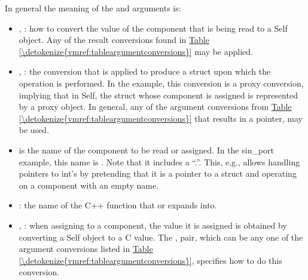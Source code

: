 \documentclass[letterpaper,10pt,english]{sphinxmanual}
\begin{document}
\begin{sphinxVerbatim}[commandchars=\\\{\}]
  
\end{sphinxVerbatim}

In general the meaning of the  and  arguments is:
\begin{itemize}
\item {} 
, : how to convert the value of the component that is being read to a
Self object. Any of the result conversions found in \hyperref[\detokenize{vmref:tableargumentconversions}]{Table \ref{\detokenize{vmref:tableargumentconversions}}} may be applied.

\item {} 
, : the conversion that is applied to produce a struct upon which the
operation is performed. In the  example, this conversion is a proxy conversion,
implying that in Self, the struct whose  component is assigned is represented by
a proxy object. In general, any of the argument conversions from \hyperref[\detokenize{vmref:tableargumentconversions}]{Table \ref{\detokenize{vmref:tableargumentconversions}}} that results in a
pointer, may be used.

\item {} 
 is the name of the component to be read or assigned. In the sin\_port example, this
name is . Note that it includes a “.”. This, e.g., allows handling pointers to
int’s by pretending that it is a pointer to a struct and operating on a component with an
empty name.

\item {} 
: the name of the C++ function that  or  expands into.

\item {} 
, : when assigning to a component, the value it is assigned is obtained by
converting a Self object to a C value. The ,  pair, which can be any one
of the argument conversions listed in \hyperref[\detokenize{vmref:tableargumentconversions}]{Table \ref{\detokenize{vmref:tableargumentconversions}}}, specifies how to do this conversion.

\end{itemize}
\end{document}
